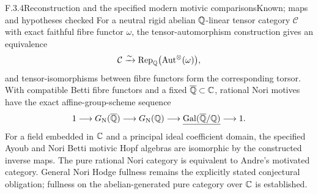 \begin{result}{F.3.4}{Reconstruction and the specified modern motivic comparisons}{Known; maps and hypotheses checked}
For a neutral rigid abelian $\mathbb Q$-linear tensor category $\mathcal C$ with exact faithful fibre functor $\omega$, the tensor-automorphism construction gives an equivalence
\[
 \mathcal C\xrightarrow{\sim}\operatorname{Rep}_\mathbb Q\bigl(\operatorname{Aut}^\otimes(\omega)\bigr),
\]
and tensor-isomorphisms between fibre functors form the corresponding torsor. With compatible Betti fibre functors and a fixed $\overline{\mathbb Q}\subset\mathbb C$, rational Nori motives have the exact affine-group-scheme sequence
\[
 1\longrightarrow G_{\mathrm N}(\overline{\mathbb Q})
 \longrightarrow G_{\mathrm N}(\mathbb Q)
 \longrightarrow\underline{\operatorname{Gal}(\overline{\mathbb Q}/\mathbb Q)}\longrightarrow1.
\]
For a field embedded in $\mathbb C$ and a principal ideal coefficient domain, the specified Ayoub and Nori Betti motivic Hopf algebras are isomorphic by the constructed inverse maps. The pure rational Nori category is equivalent to Andre's motivated category. General Nori Hodge fullness remains the explicitly stated conjectural obligation; fullness on the abelian-generated pure category over $\mathbb C$ is established.
\end{result}
